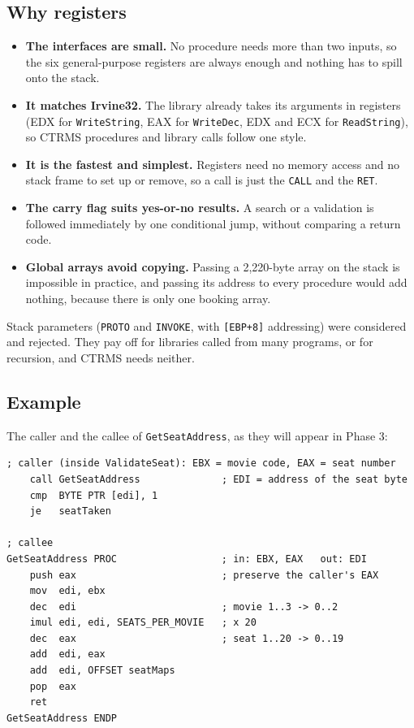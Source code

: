 \documentclass{thesis-library}
\begin{document}
\subsection*{Why registers}

\begin{itemize}
\item \textbf{The interfaces are small.} No procedure needs more than two inputs, so the six general-purpose registers are always enough and nothing has to spill onto the stack.
\item \textbf{It matches Irvine32.} The library already takes its arguments in registers (EDX for \texttt{WriteString}, EAX for \texttt{WriteDec}, EDX and ECX for \texttt{ReadString}), so CTRMS procedures and library calls follow one style.
\item \textbf{It is the fastest and simplest.} Registers need no memory access and no stack frame to set up or remove, so a call is just the \texttt{CALL} and the \texttt{RET}.
\item \textbf{The carry flag suits yes-or-no results.} A search or a validation is followed immediately by one conditional jump, without comparing a return code.
\item \textbf{Global arrays avoid copying.} Passing a 2,220-byte array on the stack is impossible in practice, and passing its address to every procedure would add nothing, because there is only one booking array.
\end{itemize}

Stack parameters (\texttt{PROTO} and \texttt{INVOKE}, with \texttt{[EBP+8]} addressing) were considered and rejected. They pay off for libraries called from many programs, or for recursion, and CTRMS needs neither.

\subsection*{Example}

The caller and the callee of \texttt{GetSeatAddress}, as they will appear in Phase 3:

\begin{lstlisting}
; caller (inside ValidateSeat): EBX = movie code, EAX = seat number
    call GetSeatAddress              ; EDI = address of the seat byte
    cmp  BYTE PTR [edi], 1
    je   seatTaken

; callee
GetSeatAddress PROC                  ; in: EBX, EAX   out: EDI
    push eax                         ; preserve the caller's EAX
    mov  edi, ebx
    dec  edi                         ; movie 1..3 -> 0..2
    imul edi, edi, SEATS_PER_MOVIE   ; x 20
    dec  eax                         ; seat 1..20 -> 0..19
    add  edi, eax
    add  edi, OFFSET seatMaps
    pop  eax
    ret
GetSeatAddress ENDP
\end{lstlisting}
\end{document}
